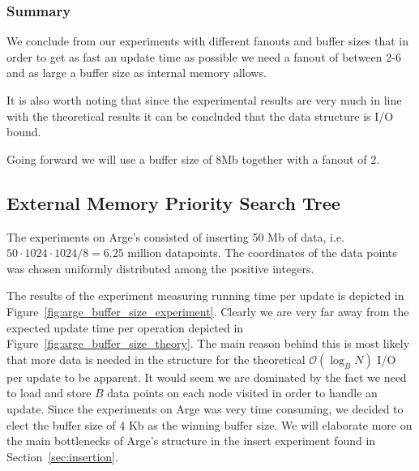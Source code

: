 \documentclass[twoside,11pt,openright]{report}
\begin{document}
\clearpage

\subsubsection*{Summary}

We conclude from our experiments with different fanouts and buffer sizes that in order to get as fast an update time as possible we need a fanout of between 2-6 and as large a buffer size as internal memory allows.

It is also worth noting that since the experimental results are very much in line with the theoretical results it can be concluded that the data structure is I/O bound.

Going forward we will use a buffer size of 8Mb together with a fanout of 2. 

\subsection{External Memory Priority Search Tree}
\label{subsec:tuning_arge}

The experiments on Arge's consisted of inserting 50 Mb of data, i.e. $50 \cdot 1024 \cdot 1024 / 8 = 6.25$ million datapoints. The coordinates of the data points was chosen uniformly distributed among the positive integers. 

The results of the experiment measuring running time per update is depicted in Figure~\ref{fig:arge_buffer_size_experiment}. Clearly we are very far away from the expected update time per operation depicted in Figure~\ref{fig:arge_buffer_size_theory}. The main reason behind this is most likely that more data is needed in the structure for the theoretical $\mathcal{O}(\log_B N)$ I/O per update to be apparent. It would seem we are dominated by the fact we need to load and store $B$ data points on each node visited in order to handle an update. Since the experiments on Arge was very time consuming, we decided to elect the buffer size of 4 Kb as the winning buffer size. We will elaborate more on the main bottlenecks of Arge's structure in the insert experiment found in Section~\ref{sec:insertion}.
\end{document}
